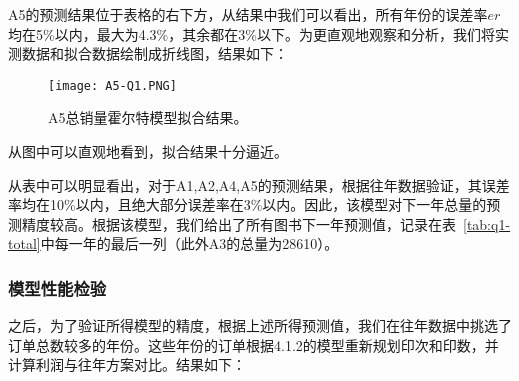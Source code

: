 \documentclass[bwprint]{gmcmthesis}
\begin{document}
A5的预测结果位于表格的右下方，从结果中我们可以看出，所有年份的误差率$er$均在5\%以内，最大为4.3\%，其余都在3\%以下。为更直观地观察和分析，我们将实测数据和拟合数据绘制成折线图，结果如下：
\begin{figure}[H]
	\centering		
	\texttt{[image: A5-Q1.PNG]}
	\caption{A5总销量霍尔特模型拟合结果。}
	\label{fig:a5-q1}
\end{figure}
从图中可以直观地看到，拟合结果十分逼近。

从表中可以明显看出，对于A1,A2,A4,A5的预测结果，根据往年数据验证，其误差率均在10\%以内，且绝大部分误差率在3\%以内。因此，该模型对下一年总量的预测精度较高。根据该模型，我们给出了所有图书下一年预测值，记录在表~\ref{tab:q1-total}中每一年的最后一列（此外A3的总量为28610）。

\subsubsection{模型性能检验}

之后，为了验证所得模型的精度，根据上述所得预测值，我们在往年数据中挑选了订单总数较多的年份。这些年份的订单根据4.1.2的模型重新规划印次和印数，并计算利润与往年方案对比。结果如下：
\end{document}
